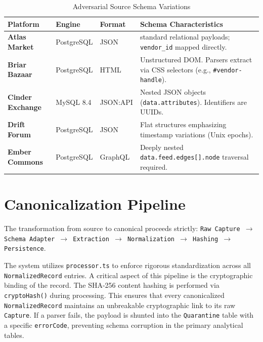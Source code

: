 \begin{table}[h]
\centering
\begin{tabular}{p{} p{} p{} p{}}
\toprule
\textbf{Platform} & \textbf{Engine} & \textbf{Format} & \textbf{Schema Characteristics} \\
\midrule
\textbf{Atlas Market} & PostgreSQL & JSON & standard relational payloads; \texttt{vendor\_id} mapped directly. \\
\textbf{Briar Bazaar} & PostgreSQL & HTML & Unstructured DOM. Parsers extract via CSS selectors (e.g., \texttt{\#vendor-handle}). \\
\textbf{Cinder Exchange} & MySQL 8.4 & JSON:API & Nested JSON objects (\texttt{data.attributes}). Identifiers are UUIDs. \\
\textbf{Drift Forum} & PostgreSQL & JSON & Flat structures emphasizing timestamp variations (Unix epochs). \\
\textbf{Ember Commons} & PostgreSQL & GraphQL & Deeply nested \texttt{data.feed.edges[].node} traversal required. \\
\bottomrule
\end{tabular}
\caption{Adversarial Source Schema Variations}
\label{tab:source-schemas}
\end{table}

\section{Canonicalization Pipeline}
\label{sec:data-pipeline}
The transformation from source to canonical proceeds strictly:
\texttt{Raw Capture $\rightarrow$ Schema Adapter $\rightarrow$ Extraction $\rightarrow$ Normalization $\rightarrow$ Hashing $\rightarrow$ Persistence}.

The system utilizes \texttt{processor.ts} to enforce rigorous standardization across all \texttt{NormalizedRecord} entries. A critical aspect of this pipeline is the cryptographic binding of the record. The SHA-256 content hashing is performed via \texttt{cryptoHash()} during processing. This ensures that every canonicalized \texttt{NormalizedRecord} maintains an unbreakable cryptographic link to its raw \texttt{Capture}. If a parser fails, the payload is shunted into the \texttt{Quarantine} table with a specific \texttt{errorCode}, preventing schema corruption in the primary analytical tables.

